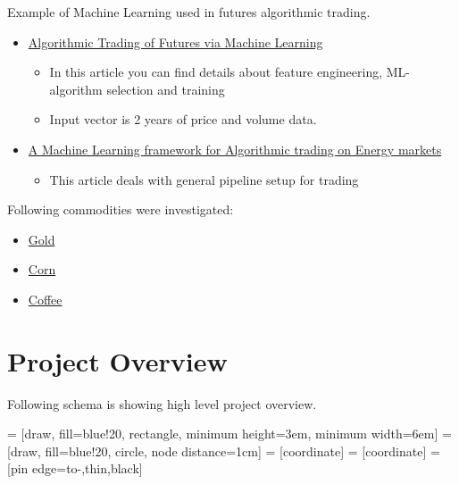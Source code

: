 \documentclass[final,2p]{elsarticle}
\begin{document}
Example of Machine Learning used in futures algorithmic trading.
\begin{itemize}
    \item \href{http://cs229.stanford.edu/proj2014/David\%20Montague,\%20Algorithmic\%20Trading\%20of\%20Futures\%20via\%20Machine\%20Learning.pdf}{Algorithmic Trading of Futures via Machine Learning}
        \begin{itemize}
            \item In this article you can find details about feature engineering, ML-algorithm selection and training
            \item Input vector is 2 years of price and volume data.
        \end{itemize}
    \item \href{https://towardsdatascience.com/https-medium-com-skuttruf-machine-learning-in-finance-algorithmic-trading-on-energy-markets-cb68f7471475}{A Machine Learning framework for Algorithmic trading on Energy markets}
        \begin{itemize}
            \item This article deals with general pipeline setup for trading
        \end{itemize}
\end{itemize}

Following commodities were investigated:
\begin{itemize}
    \item \href{https://www.cmegroup.com/trading/metals/precious/gold.html}{Gold}
    \item \href{https://www.cmegroup.com/trading/agricultural/grain-and-oilseed/corn.html}{Corn}
    \item \href{https://www.cmegroup.com/trading/agricultural/softs/coffee.html}{Coffee}
\end{itemize}
\clearpage

\section{Project Overview}

Following schema is showing high level project overview.
\newline

 = [draw, fill=blue!20, rectangle, 
    minimum height=3em, minimum width=6em]
 = [draw, fill=blue!20, circle, node distance=1cm]
 = [coordinate]
 = [coordinate]
 = [pin edge={to-,thin,black}]
\end{document}
